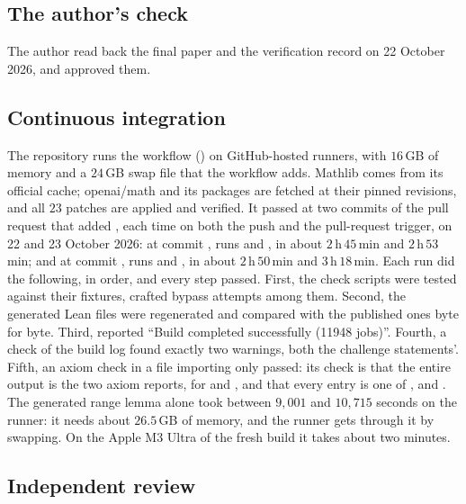\documentclass[11pt]{article}
\theoremstyle{definition}
\begin{document}
{\subsection{The author's check}\label{sec:authorcheck}

The author read back the final paper and the verification record on 22 October 2026, and approved them.

\subsection{Continuous integration}\label{sec:ci}

The repository runs the workflow  () on GitHub-hosted  runners, with $16$\,GB of memory and a $24$\,GB swap file that the workflow adds. Mathlib comes from its official cache; openai/math and its packages are fetched at their pinned revisions, and all $23$ patches are applied and verified. It passed at two commits of the pull request that added , each time on both the push and the pull-request trigger, on 22 and 23 October 2026: at commit , runs  and , in about $2$\,h\,$45$\,min and $2$\,h\,$53$\,min; and at commit , runs  and , in about $2$\,h\,$50$\,min and $3$\,h\,$18$\,min. Each run did the following, in order, and every step passed. First, the check scripts were tested against their fixtures, crafted bypass attempts among them. Second, the generated Lean files were regenerated and compared with the published ones byte for byte. Third,  reported ``Build completed successfully (11948 jobs)''. Fourth, a check of the build log found exactly two  warnings, both the challenge statements'. Fifth, an axiom check in a file importing only  passed: its check is that the entire output is the two axiom reports, for  and , and that every entry is one of ,  and . The generated range lemma  alone took between $9{,}001$ and $10{,}715$ seconds on the runner: it needs about $26.5$\,GB of memory, and the runner gets through it by swapping. On the Apple M3 Ultra of the fresh build it takes about two minutes.

\subsection{Independent review}\label{sec:review}

}
\end{document}
